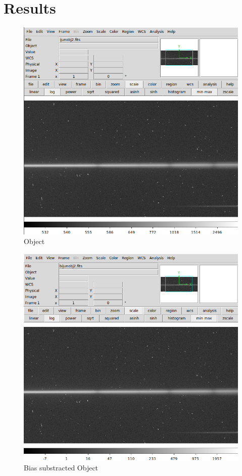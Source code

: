 \documentclass[letterpaper,11pt]{report}
\begin{document}
\section{Results}

\begin{figure}[H]
    \centering
    \includegraphics[scale=0.4]{iraf/dispersed object.png}
    \caption{Object}
    \label{fig:my_label}
\end{figure}

\begin{figure}[H]
    \centering
    \includegraphics[scale=0.4]{iraf/dispersed b.png}
    \caption{Bias substracted Object}
    \label{fig:my_label}
\end{figure}
\end{document}
